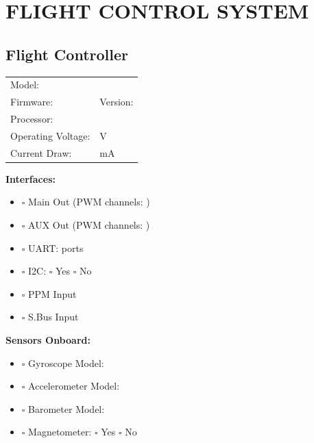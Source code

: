 \documentclass[10pt,letterpaper]{article}
\begin{document}
\section*{FLIGHT CONTROL SYSTEM}

\subsection*{Flight Controller}
\begin{tabularx}{\textwidth}{lX}
Model: & \underline{\hspace{8cm}} \\
Firmware: & \underline{\hspace{4cm}} \quad Version: \underline{\hspace{3cm}} \\
Processor: & \underline{\hspace{6cm}} \\
Operating Voltage: & \underline{\hspace{4cm}} V \\
Current Draw: & \underline{\hspace{4cm}} mA \\
\end{tabularx}

\textbf{Interfaces:}
\begin{itemize}[nosep]
\item $\square$ Main Out (PWM channels: \underline{\hspace{2cm}})
\item $\square$ AUX Out (PWM channels: \underline{\hspace{2cm}})
\item $\square$ UART: \underline{\hspace{2cm}} ports
\item $\square$ I2C: $\square$ Yes $\square$ No
\item $\square$ PPM Input
\item $\square$ S.Bus Input
\end{itemize}

\textbf{Sensors Onboard:}
\begin{itemize}[nosep]
\item $\square$ Gyroscope \quad Model: \underline{\hspace{4cm}}
\item $\square$ Accelerometer \quad Model: \underline{\hspace{4cm}}
\item $\square$ Barometer \quad Model: \underline{\hspace{4cm}}
\item $\square$ Magnetometer: $\square$ Yes $\square$ No
\end{itemize}
\end{document}
